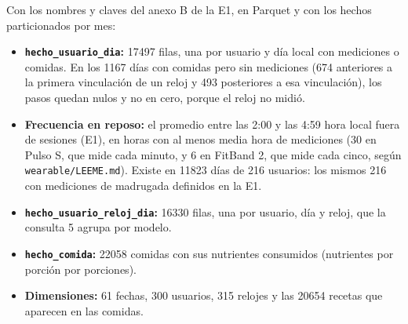 \documentclass[11pt]{article}
\begin{document}
 Con los
nombres y claves del anexo B de la E1, en Parquet y con los hechos
particionados por mes:
\begin{itemize}
  \item \textbf{\texttt{hecho\_usuario\_dia}:} 17497 filas, una por usuario y
  día local con mediciones o comidas. En los 1167 días con comidas pero sin
  mediciones (674 anteriores a la primera vinculación de un reloj y 493
  posteriores a esa vinculación), los pasos quedan nulos y no en cero, porque el
  reloj no midió.
  \item \textbf{Frecuencia en reposo:} el promedio entre las 2:00 y las 4:59
  hora local fuera de sesiones (E1), en horas con al menos media hora de
  mediciones (30 en Pulso S, que mide cada minuto, y 6 en FitBand 2, que mide
  cada cinco, según \texttt{wearable/LEEME.md}). Existe en 11823 días de 216
  usuarios: los mismos 216 con mediciones de madrugada definidos en la E1.
  \item \textbf{\texttt{hecho\_usuario\_reloj\_dia}:} 16330 filas, una por
  usuario, día y reloj, que la consulta 5 agrupa por modelo.
  \item \textbf{\texttt{hecho\_comida}:} 22058 comidas con sus nutrientes
  consumidos (nutrientes por porción por porciones).
  \item \textbf{Dimensiones:} 61 fechas, 300 usuarios, 315 relojes y las 20654
  recetas que aparecen en las comidas.
\end{itemize}
\end{document}
